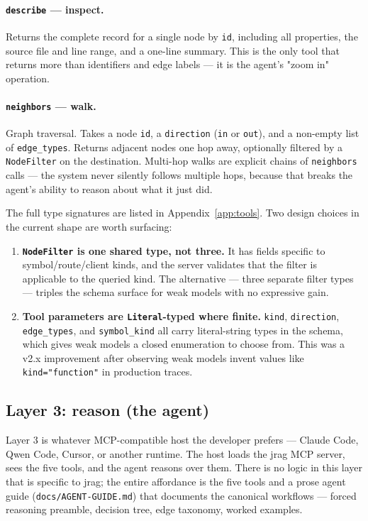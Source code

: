 \documentclass[11pt,a4paper]{article}
\begin{document}
\paragraph{\texttt{describe} --- inspect.} Returns the complete record for a single node by \texttt{id}, including all properties, the source file and line range, and a one-line summary. This is the only tool that returns more than identifiers and edge labels --- it is the agent's "zoom in" operation.

\paragraph{\texttt{neighbors} --- walk.} Graph traversal. Takes a node \texttt{id}, a \texttt{direction} (\texttt{in} or \texttt{out}), and a non-empty list of \texttt{edge\_types}. Returns adjacent nodes one hop away, optionally filtered by a \texttt{NodeFilter} on the destination. Multi-hop walks are explicit chains of \texttt{neighbors} calls --- the system never silently follows multiple hops, because that breaks the agent's ability to reason about what it just did.

The full type signatures are listed in Appendix~\ref{app:tools}. Two design choices in the current shape are worth surfacing:

\begin{enumerate}
\item \textbf{\texttt{NodeFilter} is one shared type, not three.} It has fields specific to symbol/route/client kinds, and the server validates that the filter is applicable to the queried kind. The alternative --- three separate filter types --- triples the schema surface for weak models with no expressive gain.
\item \textbf{Tool parameters are \texttt{Literal}-typed where finite.} \texttt{kind}, \texttt{direction}, \texttt{edge\_types}, and \texttt{symbol\_kind} all carry literal-string types in the schema, which gives weak models a closed enumeration to choose from. This was a v2.x improvement after observing weak models invent values like \texttt{kind="function"} in production traces.
\end{enumerate}

\subsection{Layer 3: reason (the agent)}
\label{sec:layer3}

Layer 3 is whatever MCP-compatible host the developer prefers --- Claude Code, Qwen Code, Cursor, or another runtime. The host loads the jrag MCP server, sees the five tools, and the agent reasons over them. There is no logic in this layer that is specific to jrag; the entire affordance is the five tools and a prose agent guide (\texttt{docs/AGENT-GUIDE.md}) that documents the canonical workflows --- forced reasoning preamble, decision tree, edge taxonomy, worked examples.
\end{document}
